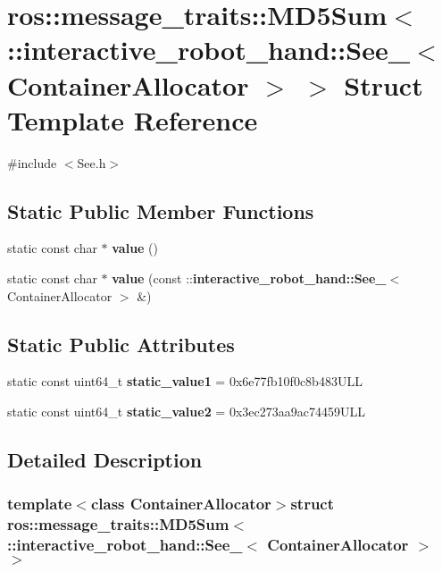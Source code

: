 \section{ros\-:\-:message\-\_\-traits\-:\-:M\-D5\-Sum$<$ \-:\-:interactive\-\_\-robot\-\_\-hand\-:\-:See\-\_\-$<$ Container\-Allocator $>$ $>$ Struct Template Reference}
\label{structros_1_1message__traits_1_1MD5Sum_3_01_1_1interactive__robot__hand_1_1See___3_01ContainerAllocator_01_4_01_4}


{\ttfamily \#include $<$See.\-h$>$}

\subsection*{Static Public Member Functions}
\begin{DoxyCompactItemize}
\item 
static const char $\ast$ {\bf value} ()
\item 
static const char $\ast$ {\bf value} (const \-::{\bf interactive\-\_\-robot\-\_\-hand\-::\-See\-\_\-}$<$ Container\-Allocator $>$ \&)
\end{DoxyCompactItemize}
\subsection*{Static Public Attributes}
\begin{DoxyCompactItemize}
\item 
static const uint64\-\_\-t {\bf static\-\_\-value1} = 0x6e77fb10f0c8b483\-U\-L\-L
\item 
static const uint64\-\_\-t {\bf static\-\_\-value2} = 0x3ec273aa9ac74459\-U\-L\-L
\end{DoxyCompactItemize}


\subsection{Detailed Description}
\subsubsection*{template$<$class Container\-Allocator$>$struct ros\-::message\-\_\-traits\-::\-M\-D5\-Sum$<$ \-::interactive\-\_\-robot\-\_\-hand\-::\-See\-\_\-$<$ Container\-Allocator $>$ $>$}



